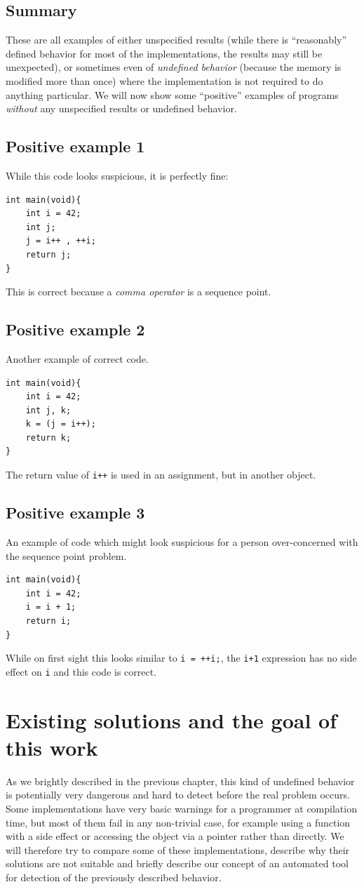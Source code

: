 \section{Summary}
These are all examples of either unspecified results (while there is ``reasonably'' defined behavior for most of the implementations, the results may still be unexpected), or sometimes even of \emph{undefined behavior} (because the memory is modified more than once) where the implementation is not required to do anything particular. We will now show some ``positive'' examples of programs \emph{without} any unspecified results or undefined behavior.

\section{Positive example 1}
While this code looks suspicious, it is perfectly fine:
\begin{lstlisting}
int main(void){
    int i = 42;
    int j;
    j = i++ , ++i;
    return j;
}
\end{lstlisting}
This is correct because a \emph{comma operator} is a sequence point.

\section{Positive example 2}
Another example of correct code.
\begin{lstlisting}
int main(void){
    int i = 42;
    int j, k;
    k = (j = i++);
    return k;
}
\end{lstlisting}
The return value of \verb|i++| is used in an assignment, but in another object.

\section{Positive example 3}
An example of code which might look suspicious for a person over-concerned with the sequence point problem.
\begin{lstlisting}
int main(void){
    int i = 42;
    i = i + 1;
    return i;
}
\end{lstlisting}
While on first sight this looks similar to \verb|i = ++i;|, the \verb|i+1| expression has no side effect on \verb|i| and this code is correct.

\chapter{Existing solutions and the goal of this work}
As we brightly described in the previous chapter, this kind of undefined behavior is potentially very dangerous and hard to detect before the real problem occurs. Some implementations have very basic warnings for a programmer at compilation time, but most of them fail in any non-trivial case, for example using a function with a side effect or accessing the object via a pointer rather than directly. We will therefore try to compare some of these implementations, describe why their solutions are not suitable and briefly describe our concept of an automated tool for detection of the previously described behavior.
